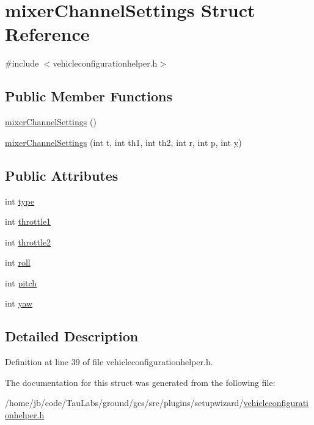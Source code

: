 \hypertarget{structmixer_channel_settings}{\section{mixer\-Channel\-Settings \-Struct \-Reference}
\label{structmixer_channel_settings}
}


{\ttfamily \#include $<$vehicleconfigurationhelper.\-h$>$}

\subsection*{\-Public \-Member \-Functions}
\begin{DoxyCompactItemize}
\item 
\hyperlink{group___vehicle_configuration_helper_gad16199c03ec2dcfd31a6930c77e6a073}{mixer\-Channel\-Settings} ()
\item 
\hyperlink{group___vehicle_configuration_helper_ga7dfd912206868944ab15d6bf785e2325}{mixer\-Channel\-Settings} (int t, int th1, int th2, int r, int p, int \hyperlink{_o_p_plots_8m_a2fb1c5cf58867b5bbc9a1b145a86f3a0}{y})
\end{DoxyCompactItemize}
\subsection*{\-Public \-Attributes}
\begin{DoxyCompactItemize}
\item 
int \hyperlink{group___vehicle_configuration_helper_gae266726733ea9753d4b40ababc4ed7dd}{type}
\item 
int \hyperlink{group___vehicle_configuration_helper_ga938151d1ab96457978b7689a772b1d2f}{throttle1}
\item 
int \hyperlink{group___vehicle_configuration_helper_gaaa198e94e22ad3c7474bef8972c5e73d}{throttle2}
\item 
int \hyperlink{group___vehicle_configuration_helper_ga41061bf67fafdf170291f3a518268645}{roll}
\item 
int \hyperlink{group___vehicle_configuration_helper_gac604b2322be856866e658f6fba34c7f7}{pitch}
\item 
int \hyperlink{group___vehicle_configuration_helper_ga16a724da7162ceb2c56798d864dac807}{yaw}
\end{DoxyCompactItemize}


\subsection{\-Detailed \-Description}


\-Definition at line 39 of file vehicleconfigurationhelper.\-h.



\-The documentation for this struct was generated from the following file\-:\begin{DoxyCompactItemize}
\item 
/home/jb/code/\-Tau\-Labs/ground/gcs/src/plugins/setupwizard/\hyperlink{vehicleconfigurationhelper_8h}{vehicleconfigurationhelper.\-h}\end{DoxyCompactItemize}
